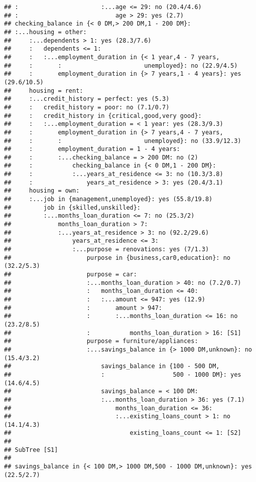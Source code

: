 \documentclass[
]{article}
\begin{document}
\begin{verbatim}
## :                       :...age <= 29: no (20.4/4.6)
## :                           age > 29: yes (2.7)
## checking_balance in {< 0 DM,> 200 DM,1 - 200 DM}:
## :...housing = other:
##     :...dependents > 1: yes (28.3/7.6)
##     :   dependents <= 1:
##     :   :...employment_duration in {< 1 year,4 - 7 years,
##     :       :                       unemployed}: no (22.9/4.5)
##     :       employment_duration in {> 7 years,1 - 4 years}: yes (29.6/10.5)
##     housing = rent:
##     :...credit_history = perfect: yes (5.3)
##     :   credit_history = poor: no (7.1/0.7)
##     :   credit_history in {critical,good,very good}:
##     :   :...employment_duration = < 1 year: yes (28.3/9.3)
##     :       employment_duration in {> 7 years,4 - 7 years,
##     :       :                       unemployed}: no (33.9/12.3)
##     :       employment_duration = 1 - 4 years:
##     :       :...checking_balance = > 200 DM: no (2)
##     :           checking_balance in {< 0 DM,1 - 200 DM}:
##     :           :...years_at_residence <= 3: no (10.3/3.8)
##     :               years_at_residence > 3: yes (20.4/3.1)
##     housing = own:
##     :...job in {management,unemployed}: yes (55.8/19.8)
##         job in {skilled,unskilled}:
##         :...months_loan_duration <= 7: no (25.3/2)
##             months_loan_duration > 7:
##             :...years_at_residence > 3: no (92.2/29.6)
##                 years_at_residence <= 3:
##                 :...purpose = renovations: yes (7/1.3)
##                     purpose in {business,car0,education}: no (32.2/5.3)
##                     purpose = car:
##                     :...months_loan_duration > 40: no (7.2/0.7)
##                     :   months_loan_duration <= 40:
##                     :   :...amount <= 947: yes (12.9)
##                     :       amount > 947:
##                     :       :...months_loan_duration <= 16: no (23.2/8.5)
##                     :           months_loan_duration > 16: [S1]
##                     purpose = furniture/appliances:
##                     :...savings_balance in {> 1000 DM,unknown}: no (15.4/3.2)
##                         savings_balance in {100 - 500 DM,
##                         :                   500 - 1000 DM}: yes (14.6/4.5)
##                         savings_balance = < 100 DM:
##                         :...months_loan_duration > 36: yes (7.1)
##                             months_loan_duration <= 36:
##                             :...existing_loans_count > 1: no (14.1/4.3)
##                                 existing_loans_count <= 1: [S2]
## 
## SubTree [S1]
## 
## savings_balance in {< 100 DM,> 1000 DM,500 - 1000 DM,unknown}: yes (22.5/2.7)

\end{verbatim}
\end{document}
